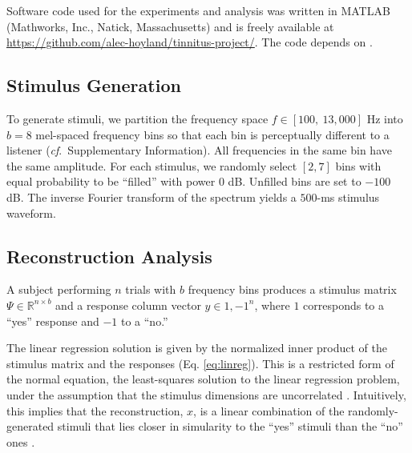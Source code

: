 \documentclass[journal]{IEEEtran}
\newcommand{\cf}{\textit{cf}.\ }
\begin{document}
Software code used for the experiments and analysis was written in MATLAB (Mathworks, Inc., Natick, Massachusetts)
and is freely available at \protect\url{https://github.com/alec-hoyland/tinnitus-project/}.
The code depends on \cite{bechtoldViolinPlotsMatlab2022,kochYaml2022,gorur-shandilyaSrinivasGsMtools2022}.

\subsection{Stimulus Generation}

To generate stimuli, we partition the frequency space $f \in [100,~13,000]$ Hz
into $b=8$ mel-spaced frequency bins
so that each bin is perceptually different to a listener \cite{polfremanSoundSpottingFrameBased2001}
(\cf Supplementary Information).
All frequencies in the same bin have the same amplitude.
For each stimulus, we randomly select $[2,7]$ bins
with equal probability to be ``filled'' with power $0$ dB.
Unfilled bins are set to $-100$ dB.
The inverse Fourier transform of the spectrum yields a $500$-ms stimulus waveform.


\subsection{Reconstruction Analysis}

A subject performing $n$ trials with $b$ frequency bins produces
a stimulus matrix $\Psi \in \mathbb{R}^{n \times b}$
and a response column vector $y \in {1,-1}^n$,
where $1$ corresponds to a ``yes'' response and $-1$ to a ``no.''


The linear regression solution is given by
the normalized inner product of the stimulus matrix
and the responses (Eq. \ref{eq:linreg}).
This is a restricted form of the normal equation,
the least-squares solution to the linear regression problem,
under the assumption that the stimulus dimensions are uncorrelated
\cite{martinCombinabilityInformationUncorrelated1966}.
Intuitively, this implies that the reconstruction, $x$,
is a linear combination of the randomly-generated stimuli
that lies closer in simularity to the ``yes'' stimuli than the ``no'' ones
\cite{gosselinSuperstitiousPerceptionsReveal2003}.
\end{document}
